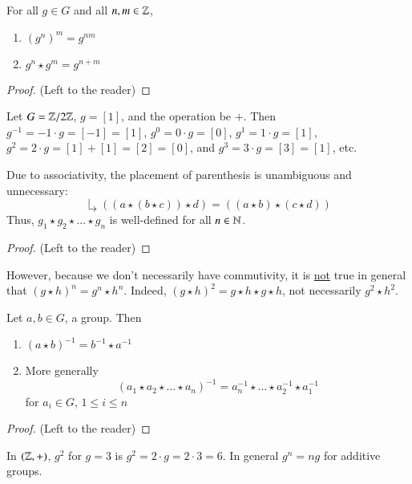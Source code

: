 \begin{prop}
    For all $g \in G$ and all $n,m \in \mathbb Z$, \begin{enumerate}
        \item $(g^n)^m = g^{nm}$
        \item $g^n\star g^m = g^{n+m}$
    \end{enumerate}
    \begin{proof}
        (Left to the reader)
    \end{proof}
\end{prop}

\begin{eg}
    Let $G = \mathbb Z/2\mathbb Z$, $g = [1]$, and the operation be $+$. Then $g^{-1} = -1\cdot g = [-1] = [1]$, $g^0 = 0\cdot g = [0]$, $g^1 = 1\cdot g = [1]$, $g^2 = 2\cdot g = [1]+[1] = [2] = [0]$, and $g^3 = 3\cdot g = [3] = [1]$, etc.
\end{eg}

\begin{rmk}
    Due to associativity, the placement of parenthesis is unambiguous and unnecessary:
    $$\drsh ((a\star (b\star c)) \star d) = ((a \star b) \star (c \star d))$$
    Thus, $g_1\star g_2 \star ... \star g_n$ is well-defined for all $n \in \mathbb N$. 
    \begin{proof}
        (Left to the reader)
    \end{proof}
\end{rmk}

\begin{note}
    However, because we don't necessarily have commutivity, it is \underline{not} true in general that $(g\star h)^n = g^n \star h^n$. Indeed, $(g\star h )^2 = g\star h \star g \star h$, not necessarily $g^2\star h^2$.
\end{note}

\begin{rmk}
    Let $a,b \in G$, a group. Then \begin{enumerate}
        \item $(a \star b)^{-1} = b^{-1}\star a^{-1}$
        \item More generally \begin{equation}
            (a_1\star a_2 \star ... \star a_n)^{-1} = a_n^{-1}\star ... \star a_2^{-1} \star a_1^{-1}
        \end{equation}
        for $a_i \in G$, $1 \leq i \leq n$
    \end{enumerate}
    \begin{proof}
        (Left to the reader)
    \end{proof}
\end{rmk}

\begin{eg}
    In $(\mathbb Z,+)$, $g^2$ for $g = 3$ is $g^2 = 2\cdot g = 2\cdot 3 = 6$. In general $g^n = ng$ for additive groups.
\end{eg}


